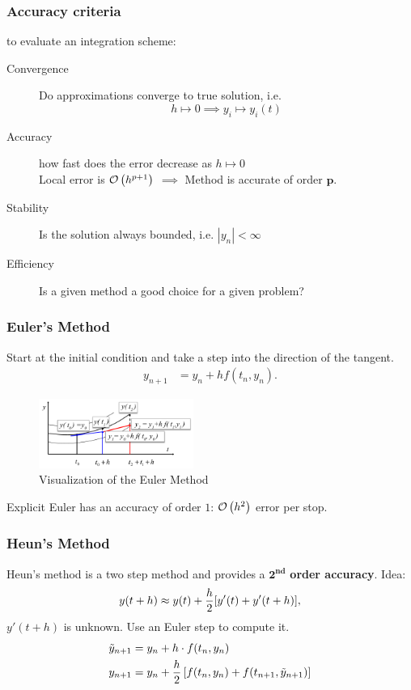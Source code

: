\begin{multicols}{2}
\subsubsection{Accuracy criteria} to evaluate an integration scheme:
\begin{description}
	\item[Convergence] Do approximations converge to true solution, i.e. 
		\[
			h\mapsto 0 \implies y_i \mapsto y_i(t)
		\]
	\item[Accuracy] how fast does the error decrease as $h\mapsto 0$\\
		Local error is $\mathcal O\left(h^{p+1}\right)$ $\implies$ Method is accurate of order $\mathbf p$.
	\item[Stability] Is the solution always bounded, i.e. $|y_n| < \infty$
	\item[Efficiency] Is a given method a good choice for a given problem?
\end{description}

\subsubsection{Euler's Method} Start at the initial condition and take a step into the direction of the tangent.
\begin{align*}
	y_{n+1} &= y_n + hf(t_n, y_n).
\end{align*}

\begin{figure}[H]
	\centering
	\includegraphics[width=0.45\textwidth]{img/01_euler}
	\caption{Visualization of the Euler Method}
\end{figure}

Explicit Euler has an accuracy of order $1$: $\mathcal O\left(h^2\right)$ error per stop.


\subsubsection{Heun's Method}
Heun's method is a two step method and provides a $\mathbf{2^{nd}}$ \textbf{order accuracy}. Idea:
\[
	y(t+h) \approx y(t) + {h \over 2} [y'(t) + y'(t+h)],
\]
$y'(t+h)$ is unknown. Use an Euler step to compute it. 
\begin{align*}
	\tilde y_{n+1} &= y_n + h\cdot f(t_n, y_n) \\
	y_{n+1} &= y_n + {h \over 2} \left[ f(t_n, y_n) + f(t_{n+1}, \tilde y_{n+1}) \right]
\end{align*}


\end{multicols}
